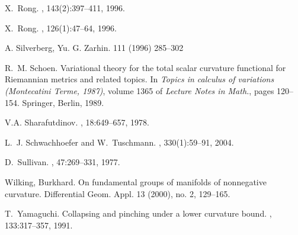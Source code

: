 \documentclass{amsart}
\begin{document}
\begin{thebibliography}{HMR75}
X.~Rong.
, 143(2):397--411, 1996.

X.~Rong.
, 126(1):47--64, 1996.

A. Silverberg, Yu. G. Zarhin.  111 (1996) 285--302

R.~M. Schoen.
\newblock Variational theory for the total scalar curvature functional for
  Riemannian metrics and related topics.
\newblock In {\em Topics in calculus of variations (Montecatini Terme, 1987)},
  volume 1365 of {\em Lecture Notes in Math.}, pages 120--154. Springer,
  Berlin, 1989.

V.A. Sharafutdinov.
, 18:649--657, 1978.

L.~J. Schwachhoefer and W.~Tuschmann.
, 330(1):59--91, 2004.

D.~Sullivan.
, 47:269--331, 1977.

Wilking, Burkhard. \newblock On fundamental groups of manifolds of nonnegative curvature. \newblock  Differential Geom. Appl.  13  (2000),  no. 2, 129--165.

T.~Yamaguchi.
\newblock Collapsing and pinching under a lower curvature bound.
, 133:317--357, 1991.



\end{thebibliography}

\end{document}
